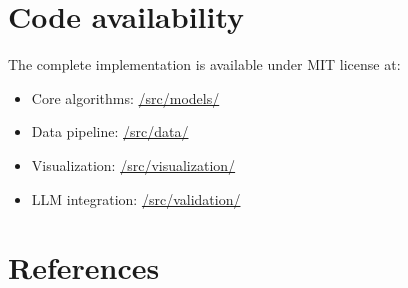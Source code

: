 \documentclass[10pt,a4paper,twocolumn]{article}
\begin{document}
\section*{Code availability}

The complete implementation is available under MIT license at:
\begin{itemize}
\item Core algorithms: \url{/src/models/}
\item Data pipeline: \url{/src/data/}
\item Visualization: \url{/src/visualization/}
\item LLM integration: \url{/src/validation/}
\end{itemize}

\section*{References}
\end{document}
